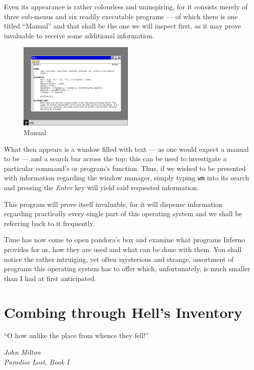 \documentclass[a5paper,twoside,12pt]{report}
\begin{document}
  Even its appearance is rather colourless and uninspiring, for it consists merely of three sub-menus and six readily executable programs — of which there is one titled ``Manual'' and that shall be the one we will inspect first, as it may prove invaluable to receive some additional information.

  \begin{figure}
    \centering
    \includegraphics[width=0.5\textwidth]{imgs/manual.png}
    \caption{Manual}
  \end{figure}

  What then appears is a window filled with text — as one would expect a manual to be — and a search bar across the top; this can be used to investigate a particular command's or program's function. Thus, if we wished to be presented with information regarding the window manager, simply typing \texttt{wm} into its search and pressing the \textit{Enter} key will yield said requested information.

  This program will prove itself invaluable, for it will dispense information regarding practically every single part of this operating system and we shall be referring back to it frequently.

  Time has now come to open pandora's box and examine what programs Inferno provides for us, how they are used and what can be done with them. You shall notice the rather intruiging, yet often mysterious and strange, assortment of programs this operating system has to offer which, unfortunately, is much smaller than I had at first anticipated.\newpage

  \chapter*{Combing through Hell's Inventory}

  \epigraph{``O how unlike the place from whence they fell!''}{\textit{John Milton\\Paradise Lost, Book I}}
\end{document}
